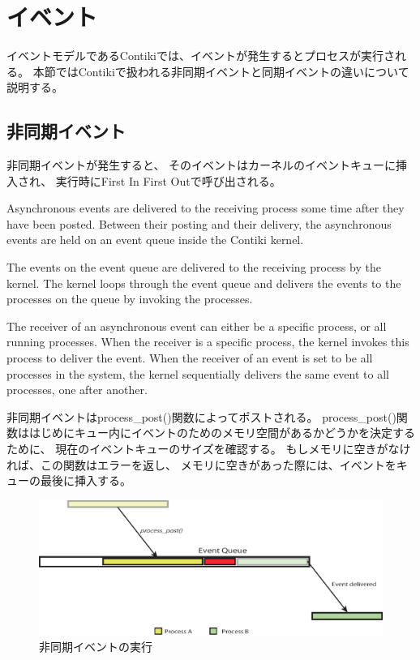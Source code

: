 \section{イベント}
イベントモデルであるContikiでは、イベントが発生するとプロセスが実行される。
本節ではContikiで扱われる非同期イベントと同期イベントの違いについて説明する。


\subsection{非同期イベント}
非同期イベントが発生すると、
そのイベントはカーネルのイベントキューに挿入され、
実行時にFirst In First Outで呼び出される。

Asynchronous events are delivered to the receiving process some time after they have been posted.
Between their posting and their delivery, 
the asynchronous events are held on an event queue inside the Contiki kernel.

The events on the event queue are delivered to the receiving process by the kernel.
The kernel loops through the event queue and 
delivers the events to the processes on the queue by invoking the processes.



The receiver of an asynchronous event can either be a specific process, or all running processes.
When the receiver is a specific process, the kernel invokes this process to deliver the event.
When the receiver of an event is set to be all processes in the system,
the kernel sequentially delivers the same event to all processes, 
one after another.

非同期イベントはprocess\_post()関数によってポストされる。
process\_post()関数ははじめにキュー内にイベントのためのメモリ空間があるかどうかを決定するために、
現在のイベントキューのサイズを確認する。
もしメモリに空きがなければ、この関数はエラーを返し、
メモリに空きがあった際には、イベントをキューの最後に挿入する。


\begin{figure}[htbp]
 \begin{center}
  \includegraphics[width=115mm]{./images/fifo.eps}
 \end{center}
 \caption{非同期イベントの実行}
 \label{fig:asynchronous_event}
\end{figure}


